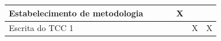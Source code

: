 \begin{table}[!h]
\begin{tabular}{|p{9cm}|c|c|c|c|c|c|}
Estabelecimento de metodologia                              &                             &                             &                              & X                          &                             &             \\ \hline
Escrita do TCC 1                                            &                             &                             &                              &                            & X                           & X          \\ \hline
\end{tabular}
\end{table}
